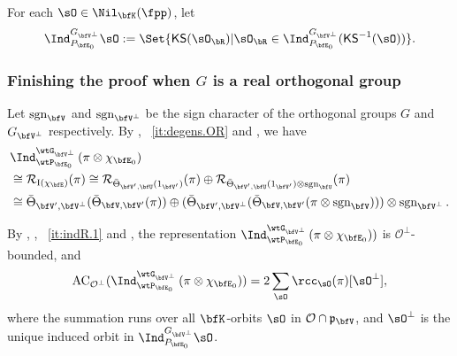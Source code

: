 \documentclass[12pt,a4paper]{amsart}
\newcommand{\AC}{\mathrm{AC}}
\newcommand{\CO}{{\mathcal {O}}}
\newcommand{\CR}{{\mathcal {R}}}
\newcommand{\RI}{{\mathrm {I}}}
\newcommand{\sgn}{\operatorname{sgn}}
\newcommand{\p}{\mathfrak p}
\numberwithin{equation}{section}
\newtheorem{lem}[thm]{Lemma}
\theoremstyle{remark}
\def\abfV{\bfV'}
\def\KS{\mathsf{KS}}
\def\Thetab{\bar{\Theta}}
\def\KV{\bfK_{\bfV}}
\def\KV{\bfK}
\def\sOR{\sO_\bR}
\def\bfVpe{\bfV^\perp}
\begin{document}
For each $\sO\in \Nil_{\bfK}(\fpp)$, let
\[
\Ind_{P_{\bfE_0}}^{G_{\bfVpe}}\sO := \Set{\KS(\sOR)|\sOR\in \Ind_{P_{\bfE_0}}^{G_{\bfVpe}}(\KS^{-1}(\sO))}.
\]





\subsubsection{Finishing the proof when $G$ is a real orthogonal group}\label{sec:PC.ro}
Let $\sgn_{\bfV}$ and $\sgn_{\bfVpe}$ be the sign character of the orthogonal
groups $G$ and $G_{\bfVpe}$
respectively.
 By , ~\ref{it:degens.OR}
 and , we have
\begin{equation}\label{eq:decomind1}
  \begin{split}
    &\Ind_{\wtP_{\bfE_0}}^{\wtG_{\bfV^\perp}} \left(\pi\otimes
      \chi_{\bfE_0}\right) \\
    &
    \cong \CR_{\RI(\chi_{\bfE})} (\pi)
    \cong \CR_{\Thetab_{\abfV,\bfU}(1_{\abfV})}(\pi)\oplus \CR_{\Thetab_{\abfV,\bfU}(1_{\abfV}) \otimes \sgn_{\bfU}}(\pi)\\
    &\cong \Thetab_{\abfV,\bfV^\perp}(\Thetab_{\bfV,\abfV}(\pi))\oplus
    (\Thetab_{\abfV,\bfV^\perp}(\Thetab_{\bfV,\abfV}(\pi\otimes \sgn_{\bfV})))\otimes
    \sgn_{\bfV^\perp}.
  \end{split}
\end{equation}


By , , ~\ref{it:indR.1} and \cite[Theorem~1.4]{SV}, the representation
  $\Ind_{\wtP_{\bfE_0}}^{\wtG_{\bfV^\perp}} \left(\pi\otimes
    \chi_{\bfE_0}\right))$ is $\CO^\perp$-bounded, and
  \begin{equation}
    \label{chop1}
    \AC_{\CO^\perp}(\Ind_{\wtP_{\bfE_0}}^{\wtG_{\bfV^\perp}} \left(\pi\otimes
      \chi_{\bfE_0}\right))=2 \sum_{\sO} \rcc_\sO(\pi) [\sO^\perp ],
  \end{equation}
  where the summation runs over all $\KV$-orbits $\sO$ in $\CO\cap \p_{\bfV}$, and
  $\sO^\perp$ is the unique induced orbit in $\Ind_{P_{\bfE_0}}^{G_{\bfVpe}}\sO$.
\end{document}
